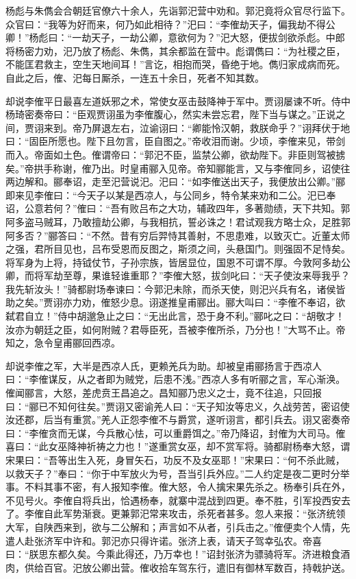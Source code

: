 杨彪与朱儁会合朝廷官僚六十余人，先诣郭汜营中劝和。郭汜竟将众官尽行监下。众官曰：“我等为好而来，何乃如此相待？”汜曰：“李傕劫天子，偏我劫不得公卿！”杨彪曰：“一劫天子，一劫公卿，意欲何为？”汜大怒，便拔剑欲杀彪。中郎将杨密力劝，汜乃放了杨彪、朱儁，其余都监在营中。彪谓儁曰：“为社稷之臣，不能匡君救主，空生天地间耳！”言讫，相抱而哭，昏绝于地。儁归家成病而死。自此之后，傕、汜每日厮杀，一连五十余日，死者不知其数。

却说李傕平日最喜左道妖邪之术，常使女巫击鼓降神于军中。贾诩屡谏不听。侍中杨琦密奏帝曰：“臣观贾诩虽为李傕腹心，然实未尝忘君，陛下当与谋之。”正说之间，贾诩来到。帝乃屏退左右，泣谕诩曰：“卿能怜汉朝，救朕命乎？”诩拜伏于地曰：“固臣所愿也。陛下且勿言，臣自图之。”帝收泪而谢。少顷，李傕来见，带剑而入。帝面如土色。傕谓帝曰：“郭汜不臣，监禁公卿，欲劫陛下。非臣则驾被掳矣。”帝拱手称谢，傕乃出。时皇甫郦入见帝。帝知郦能言，又与李傕同乡，诏使往两边解和。郦奉诏，走至汜营说汜。汜曰：“如李傕送出天子，我便放出公卿。”郦即来见李傕曰：“今天子以某是西凉人，与公同乡，特令某来劝和二公。汜已奉诏，公意若何？”傕曰：“吾有败吕布之大功，辅政四年，多著勋绩，天下共知。郭阿多盗马贼耳，乃敢擅劫公卿，与我相抗，誓必诛之！君试观我方略士众，足胜郭阿多否？”郦答曰：“不然。昔有穷后羿恃其善射，不思患难，以致灭亡。近董太师之强，君所目见也，吕布受恩而反图之，斯须之间，头悬国门。则强固不足恃矣。将军身为上将，持钺仗节，子孙宗族，皆居显位，国恩不可谓不厚。今敦阿多劫公卿，而将军劫至尊，果谁轻谁重耶？”李傕大怒，拔剑叱曰：“天子使汝来辱我乎？我先斩汝头！”骑都尉场奉谏曰：今郭汜未除，而杀天使，则汜兴兵有名，诸侯皆助之矣。”贾诩亦力劝，傕怒少息。诩遂推皇甫郦出。郦大叫曰：“李傕不奉诏，欲弑君自立！”侍中胡邈急止之曰：“无出此言，恐于身不利。”郦叱之曰：“胡敬才！汝亦为朝廷之臣，如何附贼？君辱臣死，吾被李傕所杀，乃分也！”大骂不止。帝知之，急令皇甫郦回西凉。

却说李傕之军，大半是西凉人氏，更赖羌兵为助。却被皇甫郦扬言于西凉人曰：“李傕谋反，从之者即为贼党，后患不浅。”西凉人多有听郦之言，军心渐涣。傕闻郦言，大怒，差虎贲王昌追之。昌知郦乃忠义之士，竟不往追，只回报曰：“郦已不知何往矣。”贾诩又密谕羌人曰：“天子知汝等忠义，久战劳苦，密诏使汝还郡，后当有重赏。”羌人正怨李傕不与爵赏，遂听诩言，都引兵去。诩又密奏帝曰：“李傕贪而无谋，今兵散心怯，可以重爵饵之。”帝乃降诏，封傕为大司马。傕喜曰：“此女巫降神祈祷之力也！”遂重赏女巫，却不赏军将。骑都尉杨奉大怒，谓宋果曰：“吾等出生入死，身冒矢石，功反不及女巫耶！”宋果曰：“何不杀此贼，以救天子？”奉曰：“你于中军放火为号，吾当引兵外应。”二人约定是夜二更时分举事。不料其事不密，有人报知李傕。傕大怒，令人擒宋果先杀之。杨奉引兵在外，不见号火。李傕自将兵出，恰遇杨奉，就寨中混战到四更。奉不胜，引军投西安去了。李傕自此军势渐衰。更兼郭汜常来攻击，杀死者甚多。忽人来报：“张济统领大军，自陕西来到，欲与二公解和；声言如不从者，引兵击之。”傕便卖个人情，先遣人赴张济军中许和。郭汜亦只得许诺。张济上表，请天子驾幸弘农。帝喜曰：“朕思东都久矣。今乘此得还，乃万幸也！”诏封张济为骠骑将军。济进粮食酒肉，供给百官。汜放公卿出营。傕收拾车驾东行，遣旧有御林军数百，持戟护送。

